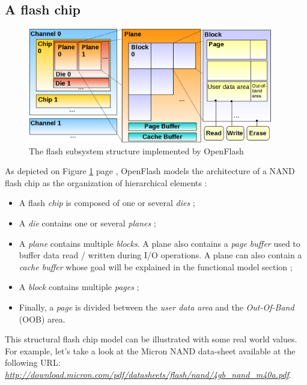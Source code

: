 \subsection{A flash chip}

\begin{figure}
  \center
  \includegraphics[width=0.95\textwidth]{Includes/ArchFlash_Fat.png}
  \caption{The flash subsystem structure implemented by OpenFlash}
  \label{fig:archflash}
\end{figure}

As depicted on Figure \ref{fig:archflash} page \pageref{fig:archflash}, OpenFlash models the architecture of a NAND flash chip as the organization of hierarchical elements :
\begin{itemize}
  \item A flash \emph{chip} is composed of one or several \emph{dies} ;
  \item A \emph{die} contains one or several \emph{planes} ;
  \item A \emph{plane} contains multiple \emph{blocks}. A plane also contains a \emph{page buffer} used to buffer data read / written during I/O operations. A plane can also contain a \emph{cache buffer} whose goal will be explained in the functional model section ;
  \item A \emph{block} contains multiple \emph{pages} ;
  \item Finally, a \emph{page} is divided between the \emph{user data area} and the \emph{Out-Of-Band} (OOB) area.
\end{itemize}

This structural flash chip model can be illustrated with some real world values. For example, let's take a look at the Micron NAND data-sheet available at the following URL:\\\href{http://download.micron.com/pdf/datasheets/flash/nand/4gb_nand_m40a.pdf}{\textit{http://download.micron.com/pdf/datasheets/flash/nand/4gb\_nand\_m40a.pdf}}.

